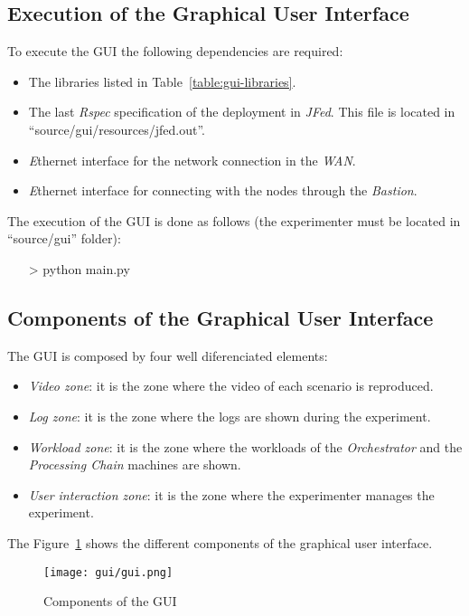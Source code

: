 \subsection{Execution of the Graphical User Interface}

To execute the \ac{GUI} the following dependencies are required:
\begin{itemize}
\item The libraries listed in Table~\ref{table:gui-libraries}. 
\item The last \emph{Rspec} specification of the \vw deployment in \emph{JFed}. This file is located in ``source/gui/resources/jfed.out''.
\item \emph Ethernet interface for the network connection in the \bonfire
  \emph{WAN}.
\item \emph Ethernet interface for connecting with the \vw nodes through the \vw \emph{Bastion}.
\end{itemize}

The execution of the \ac{GUI} is done as follows (the experimenter must be located in ``source/gui'' folder):
\begin{itemize}
\item[>] python main.py
\end{itemize}

\subsection{Components of the Graphical User Interface}

The \acl{GUI} is composed by four well diferenciated elements:
\begin{itemize}
\item \emph{Video zone}: it is the zone where the video of each scenario is reproduced.
\item \emph{Log zone}: it is the zone where the logs are shown during the experiment.
\item \emph{Workload zone}: it is the zone where the workloads of the \emph{Orchestrator} and the \emph{Processing Chain} machines are shown.
\item \emph{User interaction zone}: it is the zone where the experimenter  manages the experiment.
\end{itemize}

The Figure~\ref{fig:gui-components} shows the different components of the graphical user interface.
\begin{figure}[!h]
\begin{center}
\texttt{[image: gui/gui.png]}
\caption{Components of the GUI}
\label{fig:gui-components}
\end{center}
\end{figure}



 





